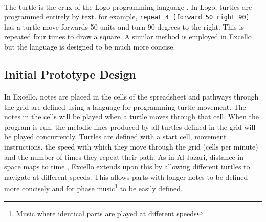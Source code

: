 \paragraph{} The turtle is the crux of the Logo programming language \cite{goldman:turtle}. In Logo, turtles are programmed entirely by text. for example, \texttt{repeat 4 [forward 50 right 90]} has a turtle move forwards 50 units and turn 90 degrees to the right. This is repeated four times to draw a square. A similar method is employed in Excello but the language is designed to be much more concise.

\subsection{Initial Prototype Design}

\paragraph{} In Excello, notes are placed in the cells of the spreadsheet and pathways through the grid are defined using a language for programming turtle movement. The notes in the cells will be played when a turtle moves through that cell. When the program is run, the melodic lines produced by all turtles defined in the grid will be played concurrently. Turtles are defined with a start cell, movement instructions, the speed with which they move through the grid (cells per minute) and the number of times they repeat their path. As in Al-Jazari, distance in space maps to time \cite{mclean:texture}, Excello extends upon this by allowing different turtles to navigate at different speeds. This allows parts with longer notes to be defined more concisely and for phase music\footnote{Music where identical parts are played at different speeds} to be easily defined.

